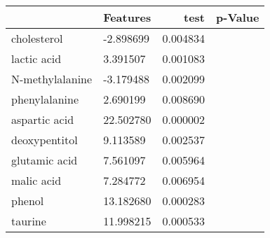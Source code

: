 \begin{tabular}{llrr}
\toprule
{} &         Features &       test &   p-Value \\
\midrule
cholesterol &  -2.898699 &  0.004834 \\
lactic acid &   3.391507 &  0.001083 \\
N-methylalanine &  -3.179488 &  0.002099 \\
phenylalanine &   2.690199 &  0.008690 \\
aspartic acid &  22.502780 &  0.000002 \\
deoxypentitol &   9.113589 &  0.002537 \\
glutamic acid &   7.561097 &  0.005964 \\
malic acid &   7.284772 &  0.006954 \\
phenol &  13.182680 &  0.000283 \\
taurine &  11.998215 &  0.000533 \\
\bottomrule
\end{tabular}
